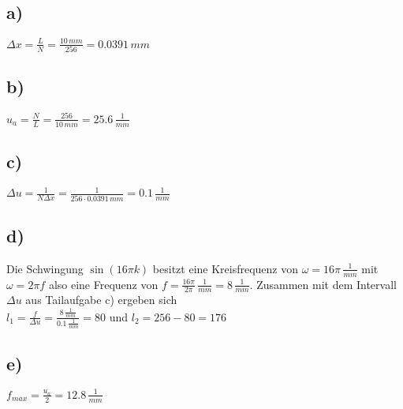 \documentclass[a4paper,11pt,oneside]{scrartcl}
\begin{document}
\subsection*{a)}

$\Delta x=\frac{L}{N}=\frac{10\,mm}{256}=0.0391\,mm$

\subsection*{b)}

$u_{a}=\frac{N}{L}=\frac{256}{10\,mm}=25.6\,\frac{1}{mm}$

\subsection*{c)}

$\Delta u=\frac{1}{N\Delta x}=\frac{1}{256\cdot0.0391\,mm}= 0.1\,\frac{1}{mm}$

\subsection*{d)}

Die Schwingung $\sin(16\pi k)$ besitzt eine Kreisfrequenz von $\omega=16\pi\,\frac{1}{mm}$ mit $\omega=2\pi f$ also eine Frequenz von $f=\frac{16\pi}{2\pi}\,\frac{1}{mm}=8\,\frac{1}{mm}$. Zusammen mit dem Intervall $\Delta u$ aus Tailaufgabe c) ergeben sich \\

$l_{1}=\frac{f}{\Delta u}=\frac{8\,\frac{1}{mm}}{0.1\,\frac{1}{mm}}=80$ und $l_{2}=256-80=176$

\subsection*{e)}

$f_{max}=\frac{u_{a}}{2}=12.8\,\frac{1}{mm}$
\end{document}
